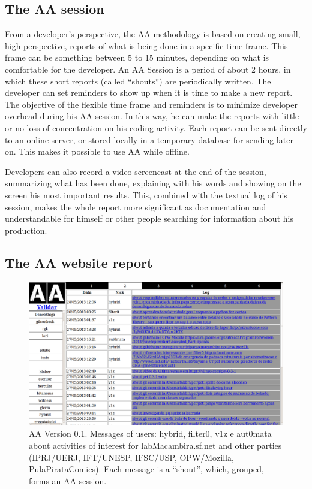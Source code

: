 \documentclass[letterpaper]{article}
\begin{document}
\subsection{The AA session}

From a developer's perspective, the AA methodology is based on creating
small, high perspective, reports of what is being done in a specific time frame. This frame
can be something between 5 to 15 minutes, depending on what is 
comfortable for the developer. An AA Session is a period of about 2
hours, in which these short reports (called ``shouts'') are periodically written. The developer can set reminders to show up when it is
time to make a new report. The objective of the flexible time frame and
reminders is to minimize developer overhead during his AA session. In this way,
he can make the reports with little or no loss of concentration on his coding activity. Each report can
be sent directly to an online server, or stored locally in a temporary
database for sending later on. This makes it possible to use AA while offline.

Developers can also record a video screencast at the end of the session,
summarizing what has been done, explaining with his words and showing on the screen his most
important results. This, combined with the textual log of his session, makes the
whole report more significant as documentation and understandable for himself or other people searching for
information about his production.

\subsection{The AA website report}

\begin{figure}
\begin{center}
   \includegraphics[width=0.95\linewidth]{figs/aa-0_1_.png}
\end{center}
   \caption{AA Version 0.1. Messages of users: hybrid, filter0, v1z e aut0mata about activities of interest for labMacambira.sf.net and other parties (IPRJ/UERJ, IFT/UNESP, IFSC/USP, OPW/Mozilla, PulaPirataComics). Each message is a ``shout'', which, grouped, forms an AA session.}
\label{fig:aaserver}
\end{figure}
\end{document}
